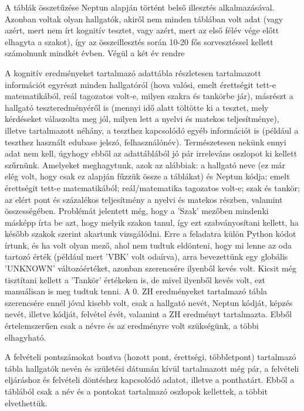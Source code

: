 \documentclass[12pt]{article}
\begin{document}
A táblák összetűzése Neptun alapján történt belső illesztés alkalmazásával. Azonban voltak olyan hallgatók, akiről nem minden táblában volt adat (vagy azért, mert nem írt kognitív tesztet, vagy azért, mert az első félév vége előtt elhagyta a szakot), így az összeillesztés során 10-20 fős sorvesztéssel kellett számolnunk mindkét évben. Végül a két év rendre






A kognitív eredményeket tartalmazó adattábla részletesen tartalmazott információt egyrészt minden hallgatóról (hova valósi, emelt érettségit tett-e matematikából, reál tagozatos volt-e, milyen szakra és tankörbe jár), másrészt a hallgató teszteredményéről is (mennyi idő alatt töltötte ki a tesztet, mely kérdéseket válaszolta meg jól, milyen lett a nyelvi és matekos teljesítménye), illetve tartalmazott néhány, a teszthez kapcsolódó egyéb információt is (például a teszthez használt edubase jelszó, felhasználónév). Természetesen nekünk ennyi adat nem kell, úgyhogy ebből az adattáblából jó pár irreleváns oszlopot ki kellett szűrnünk. Amelyeket meghagytunk, azok az alábbiak: a hallgató neve (ez már elég volt, hogy csak ez alapján fűzzük össze a táblákat) és Neptun kódja; emelt érettségit tett-e matematikából; reál/matematika tagozatos volt-e; szak és tankör; az elért pont és százalékos teljesítmény a nyelvi és matekos részben, valamint összességében. Problémát jelentett még, hogy a ’Szak’ mezőben mindenki másképp írta be azt, hogy melyik szakon tanul, így ezt szabványosítani kellett, ha később szakok szerint akartunk vizsgálódni. Erre a feladatra külön Python kódot írtunk, és ha volt olyan mező, ahol nem tudtuk eldönteni, hogy mi lenne az oda tartozó érték (például mert ’VBK’ volt odaírva), arra bevezettünk egy globális ’UNKNOWN’ változóértéket, azonban szerencsére ilyenből kevés volt. Kicsit még tisztítani kellett a ’Tankör’ értékeken is, de mivel ilyenből kevés volt, ezt manuálisan is meg tudtuk tenni.
A 0. ZH eredményeket tartalmazó tábla szerencsére ennél jóval kisebb volt, csak a hallgató nevét, Neptun kódját, képzés nevét, illetve kódját, felvétel évét, valamint a ZH eredményt tartalmazta. Ebből értelemszerűen csak a névre és az eredményre volt szükségünk, a többi elhagyható.

A felvételi pontszámokat bontva (hozott pont, érettségi, többletpont) tartalmazó tábla hallgatók nevén és születési dátumán kívül tartalmazott még pár, a felvételi eljáráshoz és felvételi döntéshez kapcsolódó adatot, illetve a ponthatárt. Ebből a táblából csak a név és a pontokat tartalmazó oszlopok kellettek, a többit elvethettük.
\end{document}
